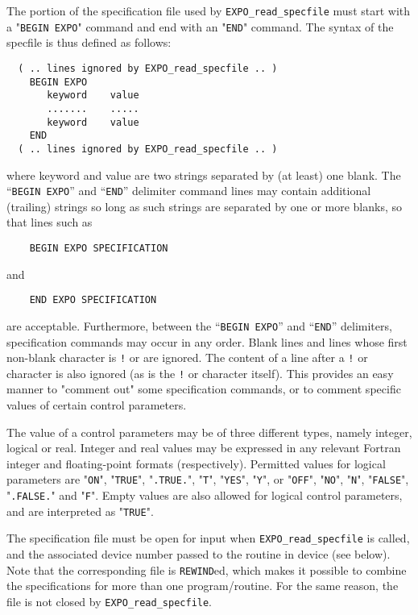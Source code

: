\documentclass{galahad}
\newcommand{\packagename}{EXPO}
\begin{document}
The portion of the specification file used by
{\tt \packagename\_read\_specfile}
must start
with a "{\tt BEGIN \packagename}" command and end with an
"{\tt END}" command.  The syntax of the specfile is thus defined as follows:
\begin{verbatim}
  ( .. lines ignored by EXPO_read_specfile .. )
    BEGIN EXPO
       keyword    value
       .......    .....
       keyword    value
    END
  ( .. lines ignored by EXPO_read_specfile .. )
\end{verbatim}
where keyword and value are two strings separated by (at least) one blank.
The ``{\tt BEGIN \packagename}'' and ``{\tt END}'' delimiter command lines
may contain additional (trailing) strings so long as such strings are
separated by one or more blanks, so that lines such as
\begin{verbatim}
    BEGIN EXPO SPECIFICATION
\end{verbatim}
and
\begin{verbatim}
    END EXPO SPECIFICATION
\end{verbatim}
are acceptable. Furthermore,
between the
``{\tt BEGIN \packagename}'' and ``{\tt END}'' delimiters,
specification commands may occur in any order.  Blank lines and
lines whose first non-blank character is {\tt !} or {\tt *} are ignored.
The content
of a line after a {\tt !} or {\tt *} character is also
ignored (as is the {\tt !} or {\tt *}
character itself). This provides an easy manner to "comment out" some
specification commands, or to comment specific values
of certain control parameters.

The value of a control parameters may be of three different types, namely
integer, logical or real.
Integer and real values may be expressed in any relevant Fortran integer and
floating-point formats (respectively). Permitted values for logical
parameters are "{\tt ON}", "{\tt TRUE}", "{\tt .TRUE.}", "{\tt T}",
"{\tt YES}", "{\tt Y}", or "{\tt OFF}", "{\tt NO}",
"{\tt N}", "{\tt FALSE}", "{\tt .FALSE.}" and "{\tt F}".
Empty values are also allowed for
logical control parameters, and are interpreted as "{\tt TRUE}".

The specification file must be open for
input when {\tt \packagename\_read\_specfile}
is called, and the associated device number
passed to the routine in device (see below).
Note that the corresponding
file is {\tt REWIND}ed, which makes it possible to combine the specifications
for more than one program/routine.  For the same reason, the file is not
closed by {\tt \packagename\_read\_specfile}.
\end{document}
